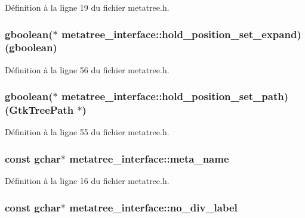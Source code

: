 Définition à la ligne 19 du fichier metatree.h.

\subsubsection[{hold\_\-position\_\-set\_\-expand}]{\setlength{\rightskip}{0pt plus 5cm}gboolean($\ast$  {\bf metatree\_\-interface::hold\_\-position\_\-set\_\-expand})(gboolean)}\label{structmetatree__interface_a0406d4ccfabf7ee063d4482d1365ab69}


Définition à la ligne 56 du fichier metatree.h.

\subsubsection[{hold\_\-position\_\-set\_\-path}]{\setlength{\rightskip}{0pt plus 5cm}gboolean($\ast$  {\bf metatree\_\-interface::hold\_\-position\_\-set\_\-path})(GtkTreePath $\ast$)}\label{structmetatree__interface_af323070e902eabe028e842724a292bc7}


Définition à la ligne 55 du fichier metatree.h.

\subsubsection[{meta\_\-name}]{\setlength{\rightskip}{0pt plus 5cm}const gchar$\ast$ {\bf metatree\_\-interface::meta\_\-name}}\label{structmetatree__interface_aa9d70406fad4f1aba6e4b601bbb95a89}


Définition à la ligne 16 du fichier metatree.h.

\subsubsection[{no\_\-div\_\-label}]{\setlength{\rightskip}{0pt plus 5cm}const gchar$\ast$ {\bf metatree\_\-interface::no\_\-div\_\-label}}\label{structmetatree__interface_a27b859e6c492a083b99ec6cde1bbfe2e}


